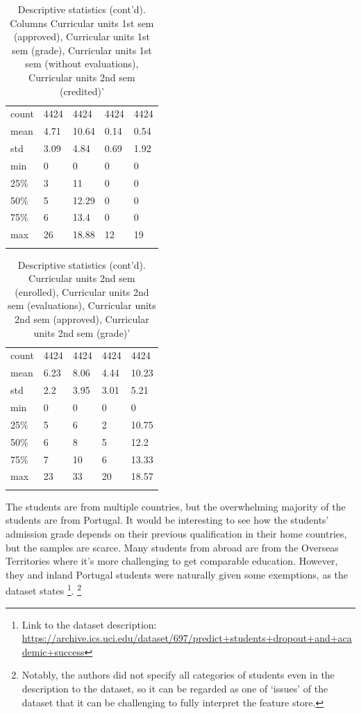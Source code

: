 \documentclass[
  letterpaper,
  DIV=11,
  numbers=noendperiod]{scrartcl}
\begin{document}
\hypertarget{tbl-descstat-6}{}
\begin{longtable}[]{@{}lllll@{}}
\toprule\noalign{}
\endfirsthead
\endhead
\bottomrule\noalign{}
\endlastfoot
count & 4424 & 4424 & 4424 & 4424 \\
mean & 4.71 & 10.64 & 0.14 & 0.54 \\
std & 3.09 & 4.84 & 0.69 & 1.92 \\
min & 0 & 0 & 0 & 0 \\
25\% & 3 & 11 & 0 & 0 \\
50\% & 5 & 12.29 & 0 & 0 \\
75\% & 6 & 13.4 & 0 & 0 \\
max & 26 & 18.88 & 12 & 19 \\
\caption{\label{tbl-descstat-6}Descriptive statistics (cont'd). Columns
Curricular units 1st sem (approved), Curricular units 1st sem (grade),
Curricular units 1st sem (without evaluations), Curricular units 2nd sem
(credited)'}\tabularnewline
\end{longtable}

\hypertarget{tbl-descstat-7}{}
\begin{longtable}[]{@{}lllll@{}}
\toprule\noalign{}
\endfirsthead
\endhead
\bottomrule\noalign{}
\endlastfoot
count & 4424 & 4424 & 4424 & 4424 \\
mean & 6.23 & 8.06 & 4.44 & 10.23 \\
std & 2.2 & 3.95 & 3.01 & 5.21 \\
min & 0 & 0 & 0 & 0 \\
25\% & 5 & 6 & 2 & 10.75 \\
50\% & 6 & 8 & 5 & 12.2 \\
75\% & 7 & 10 & 6 & 13.33 \\
max & 23 & 33 & 20 & 18.57 \\
\caption{\label{tbl-descstat-7}Descriptive statistics (cont'd).
Curricular units 2nd sem (enrolled), Curricular units 2nd sem
(evaluations), Curricular units 2nd sem (approved), Curricular units 2nd
sem (grade)'}\tabularnewline
\end{longtable}

The students are from multiple countries, but the overwhelming majority
of the students are from Portugal. It would be interesting to see how
the students' admission grade depends on their previous qualification in
their home countries, but the samples are scarce. Many students from
abroad are from the Overseas Territories where it's more challenging to
get comparable education. However, they and inland Portugal students
were naturally given some exemptions, as the dataset states \footnote{Link
  to the dataset description:
  \url{https://archive.ics.uci.edu/dataset/697/predict+students+dropout+and+academic+success}}.
\footnote{Notably, the authors did not specify all categories of
  students even in the description to the dataset, so it can be regarded
  as one of \enquote*{issues} of the dataset that it can be challenging
  to fully interpret the feature store.}
\end{document}
